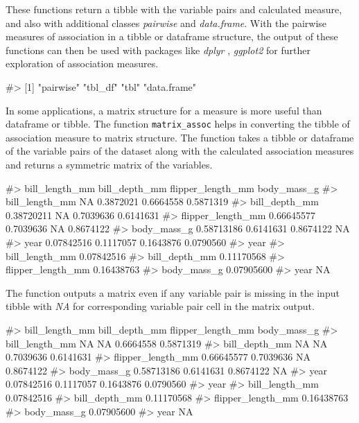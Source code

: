 These functions return a tibble with the variable pairs and calculated
measure, and also with additional classes \emph{pairwise} and
\emph{data.frame}. With the pairwise measures of association in a tibble
or dataframe structure, the output of these functions can then be used
with packages like \emph{dplyr} , \emph{ggplot2} for further exploration
of association measures.

\begin{Schunk}
\begin{Soutput}
#> [1] "pairwise"   "tbl_df"     "tbl"        "data.frame"
\end{Soutput}
\end{Schunk}

In some applications, a matrix structure for a measure is more useful
than dataframe or tibble. The function \texttt{matrix\_assoc} helps in
converting the tibble of association measure to matrix structure. The
function takes a tibble or dataframe of the variable pairs of the
dataset along with the calculated association measures and returns a
symmetric matrix of the variables.

\begin{Schunk}
\begin{Soutput}
#>                   bill_length_mm bill_depth_mm flipper_length_mm body_mass_g
#> bill_length_mm                NA     0.3872021         0.6664558   0.5871319
#> bill_depth_mm         0.38720211            NA         0.7039636   0.6141631
#> flipper_length_mm     0.66645577     0.7039636                NA   0.8674122
#> body_mass_g           0.58713186     0.6141631         0.8674122          NA
#> year                  0.07842516     0.1117057         0.1643876   0.0790560
#>                         year
#> bill_length_mm    0.07842516
#> bill_depth_mm     0.11170568
#> flipper_length_mm 0.16438763
#> body_mass_g       0.07905600
#> year                      NA
\end{Soutput}
\end{Schunk}

The function outputs a matrix even if any variable pair is missing in
the input tibble with \emph{NA} for corresponding variable pair cell in
the matrix output.

\begin{Schunk}
\begin{Soutput}
#>                   bill_length_mm bill_depth_mm flipper_length_mm body_mass_g
#> bill_length_mm                NA            NA         0.6664558   0.5871319
#> bill_depth_mm                 NA            NA         0.7039636   0.6141631
#> flipper_length_mm     0.66645577     0.7039636                NA   0.8674122
#> body_mass_g           0.58713186     0.6141631         0.8674122          NA
#> year                  0.07842516     0.1117057         0.1643876   0.0790560
#>                         year
#> bill_length_mm    0.07842516
#> bill_depth_mm     0.11170568
#> flipper_length_mm 0.16438763
#> body_mass_g       0.07905600
#> year                      NA
\end{Soutput}
\end{Schunk}

